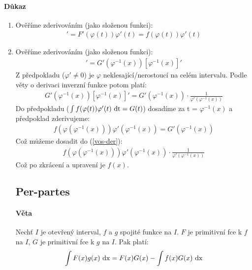 \documentclass[a4paper,10pt]{article}
\begin{document}
\paragraph{Důkaz}
\begin{enumerate}
	\item Ověříme zderivováním (jako složenou funkci):
        \begin{align}
        	[F(\varphi(t))+c]' = F'(\varphi(t)) \varphi'(t) = f(\varphi(t)) \varphi'(t)
        \end{align}
    \item Ověříme zderivováním (jako složenou funkci):
        \begin{align}
        	[G(\varphi^{-1}(x))+c]' = G'(\varphi^{-1}(x)) [ \varphi^{-1}(x)]'
        \end{align}
        Z předpokladu ($\varphi' \neq 0$) je $\varphi$ neklesající/nerostoucí na
		celém intervalu. Podle věty o derivaci inverzní funkce potom platí:
        \begin{align}
        	 \label{vos-der} G'(\varphi^{-1}(x)) [ \varphi^{-1}(x)]' = G'(\varphi^{-1}(x)) \cdot \frac{1}{\varphi'(\varphi^{-1}(x))}
        \end{align}
        Do předpokladu ($\int f(\varphi(t)) \varphi'(t) \operatorname*{\,dt} = G(t)$) dosadíme za
		t = $\varphi^{-1}(x)$ a předpoklad zderivujeme:
		\begin{align}
			f(\varphi(\varphi^{-1}(x))) \varphi'(\varphi^{-1}(x)) =
			G'(\varphi^{-1}(x))
		\end{align}
		Což můžeme dosadit do (\ref{vos-der}):
        \begin{align}
        	f(\varphi(\varphi^{-1}(x))) \varphi'(\varphi^{-1}(x)) \cdot \frac{1}{\varphi'(\varphi^{-1}(x))}
        \end{align}
        Což po zkrácení a upravení je $f(x)$.

\subsection{Per-partes}
\setcounter{equation}{0}
\paragraph{Věta} Nechť $I$ je otevřený interval, $f$ a $g$ spojité funkce na $I$. $F$ je primitivní fce k $f$ na $I$, $G$ je primitivní fce k $g$ na $I$. Pak platí:
    \begin{align*}
    	\int F(x)g(x) \operatorname*{\,dx} = F(x) G(x) - \int f(x) G(x) \operatorname*{\,dx}
    \end{align*}


\end{enumerate}
\end{document}
